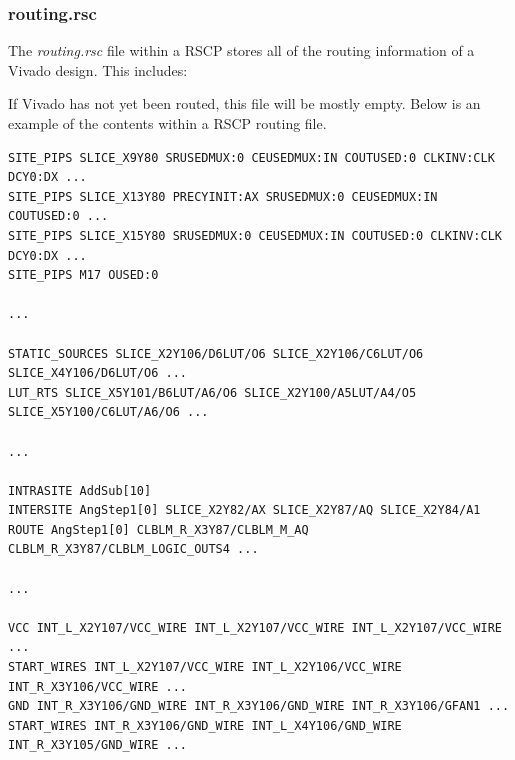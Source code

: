 \documentclass[10pt]{article}
\renewcommand{\texttt}[1]{%
  \begingroup
  \ttfamily
  \begingroup\lccode`~=`/\lowercase{\endgroup\def~}{/\discretionary{}{}{}}%
  \begingroup\lccode`~=`[\lowercase{\endgroup\def~}{[\discretionary{}{}{}}%
  \begingroup\lccode`~=`.\lowercase{\endgroup\def~}{.\discretionary{}{}{}}%
  \catcode`/=\active\catcode`[=\active\catcode`.=\active
  \scantokens{#1\noexpand}%
  \endgroup
}
\newcommand{\cls}[1]{{\texttt{#1}}}
\newcommand{\bels}{\cls{Bel}s\xspace}
\begin{document}
\subsubsection{routing.rsc}
The \textit{routing.rsc} file within a RSCP stores all of the routing
information of a Vivado design. This includes: 


\noindent
If Vivado has not yet been routed, this file will be mostly empty. Below is
an example of the contents within a RSCP routing file.

\begin{lstlisting}[numbers=none]
SITE_PIPS SLICE_X9Y80 SRUSEDMUX:0 CEUSEDMUX:IN COUTUSED:0 CLKINV:CLK DCY0:DX ...
SITE_PIPS SLICE_X13Y80 PRECYINIT:AX SRUSEDMUX:0 CEUSEDMUX:IN COUTUSED:0 ...
SITE_PIPS SLICE_X15Y80 SRUSEDMUX:0 CEUSEDMUX:IN COUTUSED:0 CLKINV:CLK DCY0:DX ...
SITE_PIPS M17 OUSED:0 

... 

STATIC_SOURCES SLICE_X2Y106/D6LUT/O6 SLICE_X2Y106/C6LUT/O6 SLICE_X4Y106/D6LUT/O6 ...
LUT_RTS SLICE_X5Y101/B6LUT/A6/O6 SLICE_X2Y100/A5LUT/A4/O5 SLICE_X5Y100/C6LUT/A6/O6 ...

...

INTRASITE AddSub[10]
INTERSITE AngStep1[0] SLICE_X2Y82/AX SLICE_X2Y87/AQ SLICE_X2Y84/A1
ROUTE AngStep1[0] CLBLM_R_X3Y87/CLBLM_M_AQ CLBLM_R_X3Y87/CLBLM_LOGIC_OUTS4 ...

...

VCC INT_L_X2Y107/VCC_WIRE INT_L_X2Y107/VCC_WIRE INT_L_X2Y107/VCC_WIRE ...
START_WIRES INT_L_X2Y107/VCC_WIRE INT_L_X2Y106/VCC_WIRE INT_R_X3Y106/VCC_WIRE ...
GND INT_R_X3Y106/GND_WIRE INT_R_X3Y106/GND_WIRE INT_R_X3Y106/GFAN1 ...
START_WIRES INT_R_X3Y106/GND_WIRE INT_L_X4Y106/GND_WIRE INT_R_X3Y105/GND_WIRE ...
\end{lstlisting}
\end{document}
